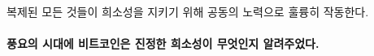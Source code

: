 복제된 모든 것들이 희소성을 지키기 위해 공동의 노력으로 훌륭히 작동한다.

\paragraph{풍요의 시대에 비트코인은 진정한 희소성이 무엇인지 알려주었다.}

%
%
%
%
%
%
%
